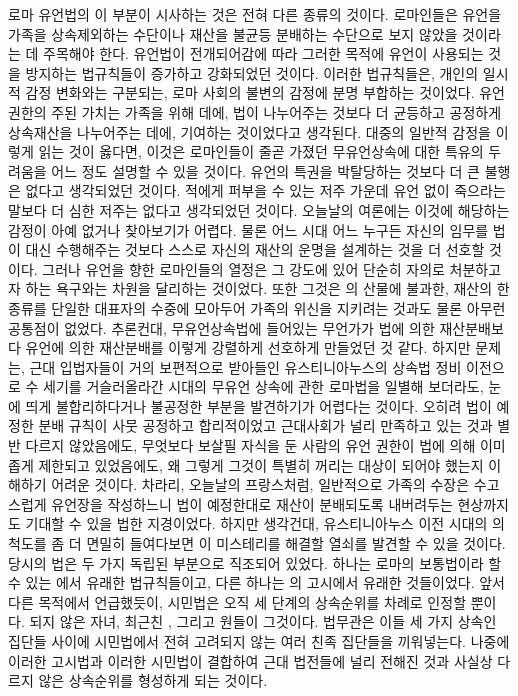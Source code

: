 로마 유언법의 이 부분이 시사하는 것은 전혀 다른 종류의 것이다.
로마인들은 유언을 가족을 상속제외하는 수단이나
재산을 불균등 분배하는 수단으로 보지 않았을 것이라는 데 주목해야 한다.
유언법이 전개되어감에 따라
그러한 목적에 유언이 사용되는 것을 방지하는 법규칙들이
증가하고 강화되었던 것이다.
이러한 법규칙들은,
개인의 일시적 감정 변화와는 구분되는,
로마 사회의 불변의 감정에 분명 부합하는 것이었다.
유언 권한의 주된 가치는 가족을 위해  데에,
법이 나누어주는 것보다 더 균등하고 공정하게
상속재산을 나누어주는 데에,
기여하는 것이었다고 생각된다.
대중의 일반적 감정을 이렇게 읽는 것이 옳다면,
이것은 로마인들이 줄곧 가졌던 무유언상속에 대한 특유의 두려움을
어느 정도 설명할 수 있을 것이다.
유언의 특권을 박탈당하는 것보다 더 큰 불행은 없다고 생각되었던 것이다.
적에게 퍼부을 수 있는 저주 가운데
유언 없이 죽으라는 말보다 더 심한 저주는 없다고 생각되었던 것이다.
오늘날의 여론에는 이것에 해당하는 감정이 아예 없거나 찾아보기가 어렵다.
물론 어느 시대 어느 누구든
자신의 임무를 법이 대신 수행해주는 것보다
스스로 자신의 재산의 운명을 설계하는 것을
더 선호할 것이다.
그러나 유언을 향한 로마인들의 열정은 그 강도에 있어
단순히 자의로 처분하고자 하는 욕구와는 차원을 달리하는 것이었다.
또한 그것은
의 산물에 불과한,
재산의 한 종류를 단일한 대표자의 수중에 모아두어
가족의 위신을 지키려는 것과도
물론 아무런 공통점이 없었다.
추론컨대,
무유언상속법에 들어있는 무언가가
법에 의한 재산분배보다
유언에 의한 재산분배를
이렇게 강렬하게
선호하게 만들었던 것 같다.
하지만 문제는,
근대 입법자들이 거의 보편적으로 받아들인
유스티니아누스의 상속법 정비 이전으로 수 세기를
거슬러올라간 시대의
무유언 상속에 관한 로마법을 일별해 보더라도,
눈에 띄게 불합리하다거나 불공정한 부분을 발견하기가 어렵다는 것이다.
오히려 법이 예정한 분배 규칙이 사뭇 공정하고 합리적이었고
근대사회가 널리 만족하고 있는 것과 별반 다르지 않았음에도,
무엇보다
보살필 자식을 둔 사람의 유언 권한이
법에 의해 이미 좁게 제한되고 있었음에도,
왜 그렇게 그것이 특별히 꺼리는 대상이 되어야 했는지 이해하기 어려운 것이다.
차라리, 오늘날의 프랑스처럼,
일반적으로 가족의 수장은 수고스럽게 유언장을 작성하느니
법이 예정한대로 재산이 분배되도록 내버려두는 현상까지도
기대할 수 있을 법한 지경이었다.
하지만 생각건대,
유스티니아누스 이전 시대의 의 척도를 좀 더 면밀히 들여다보면
이 미스테리를 해결할 열쇠를 발견할 수 있을 것이다.
당시의 법은 두 가지 독립된 부분으로 직조되어 있었다.
하나는 로마의 보통법이라 할 수 있는 에서
유래한 법규칙들이고, 다른 하나는 의 고시에서 유래한 것들이었다.
앞서 다른 목적에서 언급했듯이,
시민법은 오직 세 단계의 상속순위를 차례로 인정할 뿐이다.
되지 않은 자녀, 최근친 ,
그리고 원들이 그것이다.
법무관은
이들 세 가지 상속인 집단들 사이에
시민법에서 전혀 고려되지 않는
여러 친족 집단들을 끼워넣는다.
나중에
이러한 고시법과 이러한 시민법이 결합하여
근대 법전들에 널리 전해진 것과 사실상 다르지 않은 상속순위를
형성하게 되는 것이다.

